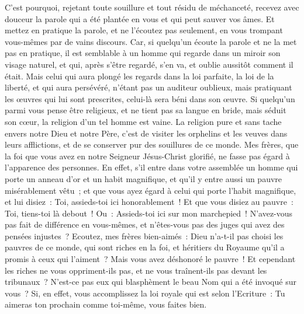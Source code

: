 \begin{multicols}{2}
C'est pourquoi, rejetant toute souillure et tout résidu de méchanceté, recevez avec douceur la parole qui a été plantée en vous et qui peut sauver vos âmes.
Et mettez en pratique la parole, et ne l'écoutez pas seulement, en vous trompant vous-mêmes par de vains discours.
Car, si quelqu'un écoute la parole et ne la met pas en pratique, il est semblable à un homme qui regarde dans un miroir son visage naturel,
et qui, après s'être regardé, s'en va, et oublie aussitôt comment il était.
Mais celui qui aura plongé les regards dans la loi parfaite, la loi de la liberté, et qui aura persévéré, n'étant pas un auditeur oublieux, mais pratiquant les œuvres qui lui sont prescrites, celui-là sera béni dans son œuvre.
Si quelqu'un parmi vous pense être religieux, et ne tient pas sa langue en bride, mais séduit son cœur, la religion d'un tel homme est vaine.
La religion pure et sans tache envers notre Dieu et notre Père, c'est de visiter les orphelins et les veuves dans leurs afflictions, et de se conserver pur des souillures de ce monde.
\VerseOne{}Mes frères, que la foi que vous avez en notre Seigneur Jésus-Christ glorifié, ne fasse pas égard à l'apparence des personnes.
En effet, s'il entre dans votre assemblée un homme qui porte un anneau d'or et un habit magnifique, et qu'il y entre aussi un pauvre misérablement vêtu~;
et que vous ayez égard à celui qui porte l'habit magnifique, et lui disiez~: Toi, assieds-toi ici honorablement~! Et que vous disiez au pauvre~: Toi, tiens-toi là debout~! Ou~: Assieds-toi ici sur mon marchepied~!
N'avez-vous pas fait de différence en vous-mêmes, et n'êtes-vous pas des juges qui avez des pensées injustes~?
Ecoutez, mes frères bien-aimés~: Dieu n'a-t-il pas choisi les pauvres de ce monde, qui sont riches en la foi, et héritiers du Royaume qu'il a promis à ceux qui l'aiment~?
Mais vous avez déshonoré le pauvre~! Et cependant les riches ne vous oppriment-ils pas, et ne vous traînent-ils pas devant les tribunaux~?
N'est-ce pas eux qui blasphèment le beau Nom qui a été invoqué sur vous~?
Si, en effet, vous accomplissez la loi royale qui est selon l'Ecriture~: Tu aimeras ton prochain comme toi-même, vous faites bien.

\end{multicols}
